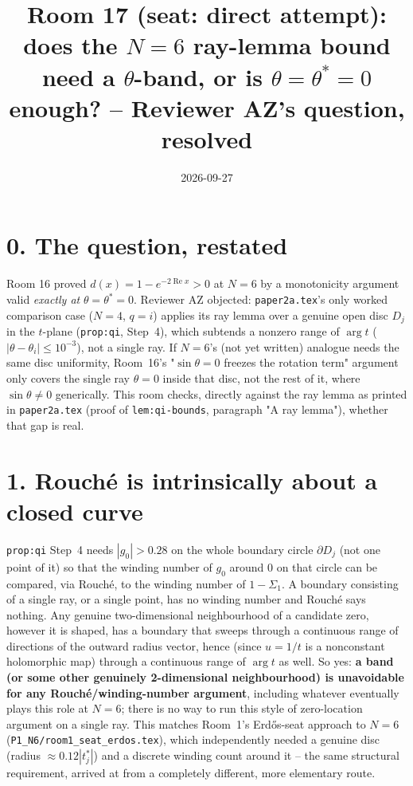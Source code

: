 \documentclass[11pt]{article}
\title{Room 17 (seat: direct attempt): does the $N=6$ ray-lemma bound need a
$\theta$-band, or is $\theta=\theta^\ast=0$ enough? -- Reviewer AZ's question, resolved}
\date{2026-09-27}
\begin{document}
\maketitle

\section*{0. The question, restated}

Room 16 proved $d(x)=1-e^{-2\operatorname{Re}x}>0$ at $N=6$ by a monotonicity argument valid
\emph{exactly at} $\theta=\theta^\ast=0$. Reviewer AZ objected: \texttt{paper2a.tex}'s only worked
comparison case ($N=4$, $q=i$) applies its ray lemma over a genuine open disc $D_j$ in the $t$-plane
(\texttt{prop:qi}, Step~4), which subtends a nonzero range of $\arg t$ ($|\theta-\theta_i|\le10^{-3}$),
not a single ray. If $N=6$'s (not yet written) analogue needs the same disc uniformity, Room~16's
"$\sin\theta=0$ freezes the rotation term" argument only covers the single ray $\theta=0$ inside that
disc, not the rest of it, where $\sin\theta\ne0$ generically. This room checks, directly against the
ray lemma as printed in \texttt{paper2a.tex} (proof of \texttt{lem:qi-bounds}, paragraph "A ray
lemma"), whether that gap is real.

\section*{1. Rouch\'e is intrinsically about a closed curve}

\texttt{prop:qi} Step~4 needs $|g_0|>0.28$ on the whole boundary circle $\partial D_j$ (not one point of
it) so that the winding number of $g_0$ around $0$ on that circle can be compared, via Rouch\'e, to the
winding number of $1-\Sigma_1$. A boundary consisting of a single ray, or a single point, has no
winding number and Rouch\'e says nothing. Any genuine two-dimensional neighbourhood of a candidate zero,
however it is shaped, has a boundary that sweeps through a continuous range of directions of the
outward radius vector, hence (since $u=1/t$ is a nonconstant holomorphic map) through a continuous range
of $\arg t$ as well. So yes: \textbf{a band (or some other genuinely 2-dimensional neighbourhood) is
unavoidable for any Rouch\'e/winding-number argument}, including whatever eventually plays this role at
$N=6$; there is no way to run this style of zero-location argument on a single ray. This matches Room~1's
Erd\H{o}s-seat approach to $N=6$ (\texttt{P1\_N6/room1\_seat\_erdos.tex}), which independently needed a
genuine disc (radius $\approx0.12|t_j^\ast|$) and a discrete winding count around it -- the same
structural requirement, arrived at from a completely different, more elementary route.
\end{document}
